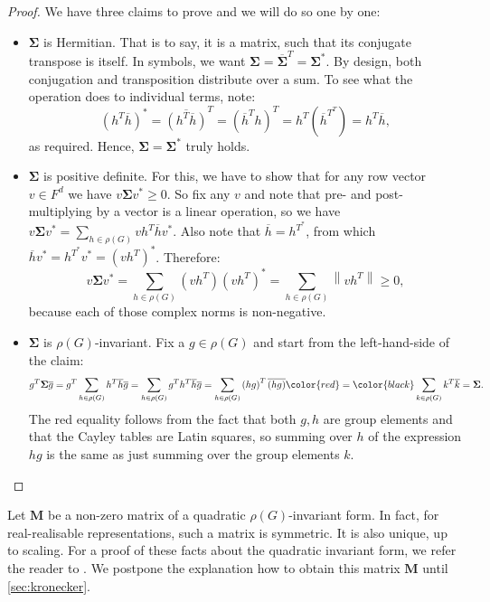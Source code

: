 \documentclass[11pt]{article}
\begin{document}
\begin{proof}
  We have three claims to prove and we will do so one by one:
  \begin{itemize}
    \item $\mathbf{\Sigma}$ is Hermitian. That is to say, it is a matrix, such that its conjugate
    transpose is itself. In symbols, we want $\mathbf{\Sigma} = \overline{\mathbf{\Sigma}}^T = \mathbf{\Sigma}^*$.
    By design, both conjugation and transposition distribute over a sum. To see what the operation
    does to individual terms, note:
    \[\left(h^T\overline{h}\right)^* = \overline{\left(h^T\overline{h}\right)}^T =
    \left(\overline{h}^Th\right)^T = h^T\left(\overline{h}^{T^T}\right) = h^T\overline{h},\]
    as required. Hence, $\mathbf{\Sigma} = \mathbf{\Sigma}^*$ truly holds.
    \item $\mathbf{\Sigma}$ is positive definite. For this, we have to show that for any row vector $v \in F^d$
    we have $v\mathbf{\Sigma}v^* \geq 0$. So fix any $v$ and note that pre- and post-multiplying by
    a vector is a linear operation, so we have $v\mathbf{\Sigma}v^* = \sum_{h \in \rho(G)} vh^T\overline{h}v^*$.
    Also note that $\overline{h} = h^{T^*}$, from which $\overline{h}v^* = h^{T^*}v^* = \left(vh^T\right)^*$. Therefore:
    \[v\mathbf{\Sigma}v^* = \sum_{h \in \rho(G)} \left(vh^T\right)\left(vh^T\right)^* = \sum_{h \in \rho(G)} \left\lVert vh^T\right\rVert \geq 0,\]
    because each of those complex norms is non-negative.
    \item $\mathbf{\Sigma}$ is $\rho(G)$-invariant. Fix a $g \in \rho(G)$ and start from the left-hand-side of the claim:
    \[g^T\mathbf{\Sigma}\overline{g} = g^T\sum_{h \in \rho(G)}h^T\overline{h} \overline{g} = \sum_{h \in \rho(G)}g^Th^T\overline{h} \overline{g}=
    \sum_{h \in \rho(G)} \left(hg\right)^T \overline{(hg)} \color{red}=\color{black} \sum_{k \in \rho(G)} k^T \overline{k} = \mathbf{\Sigma}.\]
    The red equality follows from the fact that both $g,h$ are group elements and that the Cayley tables are Latin squares, so
    summing over $h$ of the expression $hg$ is the same as just summing over the group elements $k$.
  \end{itemize}
\end{proof}

Let $\mathbf{M}$ be a non-zero matrix of a quadratic $\rho(G)$-invariant form.
In fact, for real-realisable representations, such a matrix is symmetric. It is
also unique, up to scaling. For a proof of these facts about the quadratic
invariant form, we refer the reader to \cite[(4.14)]{ISAACS}. We postpone the
explanation how to obtain this matrix $\mathbf{M}$ until \cref{sec:kronecker}.
\end{document}
